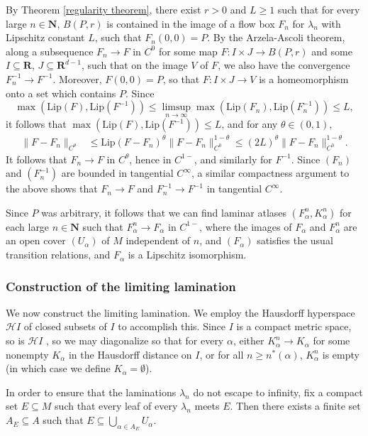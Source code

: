 \documentclass[reqno,11pt]{amsart}
\newcommand{\NN}{\mathbf{N}}
\newcommand{\RR}{\mathbf{R}}
\newcommand{\Hypspace}{\mathscr H}
\newcommand{\Lip}{\mathrm{Lip}}
\theoremstyle{definition}
\numberwithin{equation}{section}
\begin{document}
By Theorem \ref{regularity theorem}, there exist $r > 0$ and $L \geq 1$ such that for every large $n \in \NN$, $B(P, r)$ is contained in the image of a flow box $F_n$ for $\lambda_n$ with Lipschitz constant $L$, such that $F_n(0, 0) = P$.
By the Arzela-Ascoli theorem, along a subsequence $F_n \to F$ in $C^0$ for some map $F: I \times J \to B(P, r)$ and some $I \subseteq \RR$, $J \subseteq \RR^{d - 1}$, such that on the image $V$ of $F$, we also have the convergence $F_n^{-1} \to F^{-1}$.
Moreover, $F(0, 0) = P$, so that $F: I \times J \to V$ is a homeomorphism onto a set which contains $P$.
Since
$$\max(\Lip(F), \Lip(F^{-1})) \leq \limsup_{n \to \infty} \max(\Lip(F_n), \Lip(F_n^{-1})) \leq L,$$
it follows that $\max(\Lip(F), \Lip(F^{-1})) \leq L$, and for any $\theta \in (0, 1)$,
\begin{align*}
	\|F - F_n\|_{C^\theta}
	&\leq \Lip(F - F_n)^\theta \|F - F_n\|_{C^0}^{1 - \theta} \leq (2L)^\theta \|F - F_n\|_{C^0}^{1 - \theta}.
\end{align*}
It follows that $F_n \to F$ in $C^\theta$, hence in $C^{1-}$, and similarly for $F^{-1}$.
Since $(F_n)$ and $(F_n^{-1})$ are bounded in tangential $C^\infty$, a similar compactness argument to the above shows that $F_n \to F$ and $F_n^{-1} \to F^{-1}$ in tangential $C^\infty$.

Since $P$ was arbitrary, it follows that we can find laminar atlases $(F_\alpha^n, K_\alpha^n)$ for each large $n \in \NN$ such that $F_\alpha^n \to F_\alpha$ in $C^{1-}$, where the images of $F_\alpha$ and $F_\alpha^n$ are an open cover $(U_\alpha)$ of $M$ independent of $n$, and $(F_\alpha)$ satisfies the usual transition relations, and $F_\alpha$ is a Lipschitz isomorphism.


\subsubsection{Construction of the limiting lamination}
We now construct the limiting lamination.
We employ the Hausdorff hyperspace $\Hypspace I$ of closed subsets of $I$ to accomplish this.
Since $I$ is a compact metric space, so is $\Hypspace I$ \cite[Theorem 4.17]{nadler2017continuum}, so we may diagonalize so that for every $\alpha$, either $K^n_\alpha \to K_\alpha$ for some nonempty $K_\alpha$ in the Hausdorff distance on $I$, or for all $n \geq n^*(\alpha)$, $K_\alpha^n$ is empty (in which case we define $K_\alpha = \emptyset$).

In order to ensure that the laminations $\lambda_n$ do not escape to infinity, fix a compact set $E \subseteq M$ such that every leaf of every $\lambda_n$ meets $E$.
Then there exists a finite set $A_E \subseteq A$ such that $E \subseteq \bigcup_{\alpha \in A_E} U_\alpha$.
\end{document}
